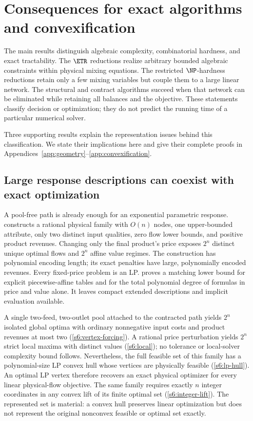 \section{Consequences for exact algorithms and convexification}\label{s6:synthesis}

The main results distinguish algebraic complexity, combinatorial hardness,
and exact tractability. The $\ETR$ reductions realize arbitrary bounded
algebraic constraints within physical mixing equations. The restricted
$\NP$-hardness reductions retain only a few mixing variables but couple
them to a large linear network. The structural and contract algorithms
succeed when that network can be eliminated while retaining all balances
and the objective. These statements classify decision or optimization;
they do not predict the running time of a particular numerical solver.

Three supporting results explain the representation issues behind this
classification. We state their implications here and give their complete
proofs in Appendices~\ref{app:geometry}--\ref{app:convexification}.

\subsection{Large response descriptions can coexist with exact optimization}
A pool-free path is already enough for an exponential parametric response.
 constructs a rational physical family with
$O(n)$ nodes, one upper-bounded attribute, only two distinct input
qualities, zero flow lower bounds, and positive product revenues.
Changing only the final product's price exposes $2^n$ distinct unique
optimal flows and $2^n$ affine value regimes. The construction has
polynomial encoding length; its exact penalties have large, polynomially
encoded revenues. Every fixed-price problem is an LP.
 proves a matching lower bound for explicit
piecewise-affine tables and for the total polynomial degree of formulas
in price and value alone. It leaves compact extended descriptions and
implicit evaluation available.

A single two-feed, two-outlet pool attached to the contracted path yields
$2^n$ isolated global optima with ordinary nonnegative input costs and
product revenues at most two (\cref{s6:vertex-forcing}). A rational price
perturbation yields $2^n$ strict local maxima with distinct values
(\cref{s6:local}); no tolerance or local-solver complexity bound follows.
Nevertheless, the full feasible set of this family has a polynomial-size
LP convex hull whose vertices are physically feasible
(\cref{s6:lp-hull}). An optimal LP vertex therefore recovers an exact
physical optimizer for every linear physical-flow objective. The same
family requires exactly $n$ integer coordinates in any convex lift of
its finite optimal set (\cref{s6:integer-lift}). The represented set is
material: a convex hull preserves linear optimization but does not
represent the original nonconvex feasible or optimal set exactly.

